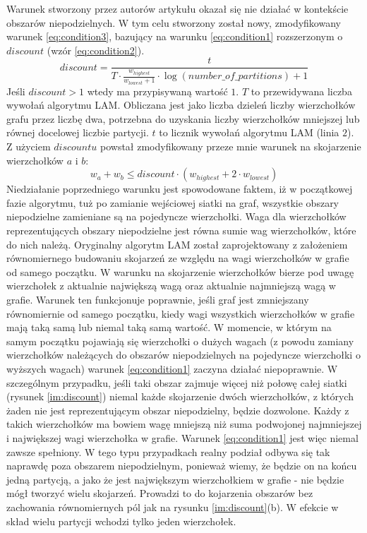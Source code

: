 Warunek stworzony przez autorów artykułu \cite{weighted_maching} okazał się nie działać w kontekście obszarów
niepodzielnych.
W tym celu stworzony został nowy, zmodyfikowany warunek \ref{eq:condition3}, bazujący na warunku \ref{eq:condition1}
rozszerzonym o $discount$ (wzór \ref{eq:condition2}).
\begin{equation}
discount = \frac{t}{T \cdot \frac{w_{highest}}{w_{lowest} + 1} \cdot \log(number\_of\_partitions) + 1}
\label{eq:condition2}
\end{equation}
Jeśli $discount > 1$ wtedy ma przypisywaną wartość $1$.
$T$ to przewidywana liczba wywołań algorytmu LAM.
Obliczana jest jako liczba dzieleń liczby wierzchołków grafu przez liczbę dwa, potrzebna do uzyskania liczby wierzchołków mniejszej
lub równej docelowej liczbie partycji.
$t$ to licznik wywołań algorytmu LAM (linia $2$).
Z użyciem $discountu$ powstał zmodyfikowany przeze mnie warunek na skojarzenie wierzchołków $a$ i $b$:
\begin{equation}
w_{a} + w_{b} \leq discount \cdot (w_{highest} + 2 \cdot w_{lowest})
\label{eq:condition3}
\end{equation}
Niedziałanie poprzedniego warunku jest spowodowane faktem,
iż w początkowej fazie algorytmu, tuż po zamianie wejściowej siatki na graf,
wszystkie obszary niepodzielne zamieniane są na pojedyncze wierzchołki.
Waga dla wierzchołków reprezentujących obszary niepodzielne jest równa sumie wag wierzchołków, które do nich należą.
Oryginalny algorytm LAM został zaprojektowany z założeniem równomiernego budowaniu skojarzeń ze względu na wagi wierzchołków w grafie
od samego początku.
W warunku na skojarzenie wierzchołków bierze pod uwagę wierzchołek z aktualnie największą wagą
oraz aktualnie najmniejszą wagą w grafie.
Warunek ten funkcjonuje poprawnie, jeśli graf jest zmniejszany równomiernie od samego początku, kiedy wagi wszystkich
wierzchołków w grafie mają taką samą lub niemal taką samą wartość.
W momencie, w którym na samym początku pojawiają się wierzchołki o dużych wagach (z powodu zamiany wierzchołków
należących do obszarów niepodzielnych na pojedyncze wierzchołki o wyższych wagach) warunek \ref{eq:condition1} zaczyna
działać niepoprawnie.
W szczególnym przypadku, jeśli taki obszar zajmuje więcej niż połowę całej siatki
(rysunek \ref{im:discount}) niemal każde skojarzenie dwóch wierzchołków, z których żaden nie jest
reprezentującym obszar niepodzielny, będzie dozwolone.
Każdy z takich wierzchołków ma bowiem wagę mniejszą niż suma podwojonej najmniejszej i największej
wagi wierzchołka w grafie.
Warunek \ref{eq:condition1} jest więc niemal zawsze spełniony.
W tego typu przypadkach realny podział odbywa się tak naprawdę poza obszarem niepodzielnym, ponieważ wiemy, że będzie on
na końcu jedną partycją, a jako że jest największym wierzchołkiem w grafie - nie będzie mógł tworzyć
wielu skojarzeń.
Prowadzi to do kojarzenia obszarów bez zachowania równomiernych pól jak na rysunku \ref{im:discount}(b).
W efekcie w skład wielu partycji wchodzi tylko jeden wierzchołek.

